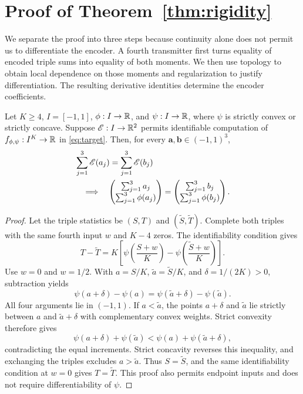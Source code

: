 \section{Proof of Theorem~\ref{thm:rigidity}}\label{app:rigidity-proof}
We separate the proof into three steps because continuity alone does not permit us to differentiate the encoder. A fourth transmitter first turns equality of encoded triple sums into equality of both moments. We then use topology to obtain local dependence on those moments and regularization to justify differentiation. The resulting derivative identities determine the encoder coefficients.

\begin{lemma}
\label{lem:collision}
Let $K\ge4$, $I=[-1,1]$, $\phi:I\to\mathbb R$, and $\psi:I\to\mathbb R$, where $\psi$ is strictly convex or strictly concave. Suppose $\mathscr E:I\to\mathbb R^2$ permits identifiable computation of $f_{\phi,\psi}:I^K\to\mathbb R$ in \eqref{eq:target}. Then, for every $\mathbf a,\mathbf b\in(-1,1)^3$,
\begin{align*}
 &\sum_{j=1}^3\mathscr E(a_j)=\sum_{j=1}^3\mathscr E(b_j)\\
 &\quad\Longrightarrow\quad
 \begin{pmatrix}\sum_{j=1}^3 a_j\\\sum_{j=1}^3\phi(a_j)\end{pmatrix}
 =\begin{pmatrix}\sum_{j=1}^3 b_j\\\sum_{j=1}^3\phi(b_j)\end{pmatrix}.
\end{align*}
\end{lemma}
\begin{proof}
Let the triple statistics be $(S,T)$ and $(\widetilde S,\widetilde T)$. Complete both triples with the same fourth input $w$ and $K-4$ zeros. The identifiability condition gives
$$
 T-\widetilde T
 =K\left[\psi\!\left(\frac{S+w}{K}\right)
 -\psi\!\left(\frac{\widetilde S+w}{K}\right)\right].
$$
Use $w=0$ and $w=1/2$. With $a=S/K$, $\widetilde a=\widetilde S/K$, and $\delta=1/(2K)>0$, subtraction yields
$$
 \psi(a+\delta)-\psi(a)
 =\psi(\widetilde a+\delta)-\psi(\widetilde a).
$$
All four arguments lie in $(-1,1)$. If $a<\widetilde a$, the points $a+\delta$ and $\widetilde a$ lie strictly between $a$ and $\widetilde a+\delta$ with complementary convex weights. Strict convexity therefore gives
$$
 \psi(a+\delta)+\psi(\widetilde a)
 <\psi(a)+\psi(\widetilde a+\delta),
$$
contradicting the equal increments. Strict concavity reverses this inequality, and exchanging the triples excludes $a>\widetilde a$. Thus $S=\widetilde S$, and the same identifiability condition at $w=0$ gives $T=\widetilde T$. This proof also permits endpoint inputs and does not require differentiability of $\psi$.
\end{proof}

